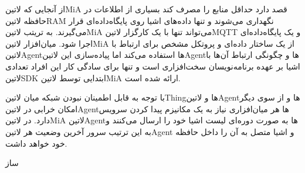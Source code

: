 \documentclass[]{assignment}
\begin{document}
از آنجایی که ‌لاتین{MiA} قصد دارد حداقل منابع را مصرف کند بسیاری از اطلاعات در حافظه ‌لاتین{RAM} نگهداری می‌شوند و تنها داده‌های اشیا روی پایگاه‌داده‌ای قرار می‌گیرند.
به تریتب ‌لاتین{MiA} می‌تواند تنها با یک کارگزار ‌لاتین{MQTT} و یک پایگاه‌داده‌ای اجرا شود.
میان‌افزار ‌لاتین{MiA} از یک ساختار داده‌ای و پروتکل مشخص برای ارتباط با ‌لاتین{Agent}ها استفاده می‌کند اما پیاده‌سازی این ‌لاتین{Agent}ها و چگونگی ارتباط آن‌ها با
اشیا بر عهده برنامه‌نویسان سخت‌افزاری است و تنها برای سادگی کار این افراد تعدادی ‌لاتین{SDK} ابتدایی توسط ‌لاتین{MiA} ارائه شده است.

با توجه به قابل اطمینان نبودن شبکه میان ‌لاتین{Thing}ها و ‌لاتین{Agent}ها و از سوی دیگر امکان خرابی در ‌لاتین{Agent}ها هر میان‌افزاری نیاز به یک مکانیزم پیدا کردن سرویس
دارد. در ‌لاتین{MiA} ‌لاتین{Agent}ها به صورت دوره‌ای لیست اشیا خود را ارسال می‌کنند و به این ترتیب سرور آخرین وضعیت هر ‌لاتین{Agent} و اشیا متصل به آن را داخل حافظه خود خواهد داشت.


 
 

‌ساز
\end{document}
